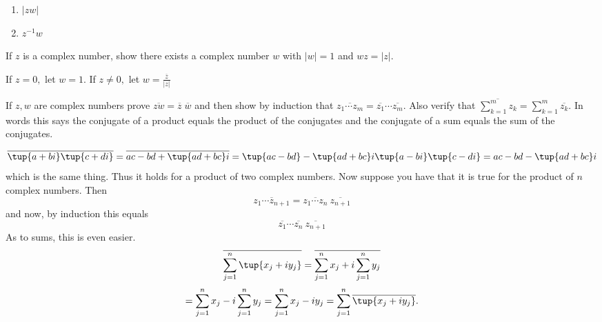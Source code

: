 \begin{enumialphparenastyle}
\begin{ex}
\begin{enumerate}
\item $\left| zw \right|$

\item $z^{-1}w$

\end{enumerate}
\end{ex}

\begin{ex} If $z$ is a complex number, show there exists a complex
number $w$ with $\left\vert w \right\vert =1$ and $wz=\left\vert
z\right\vert .$ 
\begin{sol}
If $z=0,$ let $w =1.$ If $z\neq 0,$ let $w =\displaystyle\frac{\overline{z}}{\left\vert z\right\vert }$
\end{sol}
\end{ex}

\begin{ex} \label{exercomplex2}If $z,w$ are complex
 numbers prove $
\overline{zw}=\overline{z} \; \overline{w}$ and then show by induction that 
$\overline{z_{1}\cdots z_{m}}=\overline{z_{1}}\cdots \overline{z_{m}}$. Also
verify that $\overline{\sum_{k=1}^{m}z_{k}}=\sum_{k=1}^{m}\overline{z_{k}}$.
In words this says the conjugate of a product equals the product of the
conjugates and the conjugate of a sum equals the sum of the conjugates. 
\begin{sol}
\[
\overline{\tup{a+bi} \tup{c+di} }=\overline{ac-bd+\tup{
ad+bc}i }=\tup{ac-bd} -\tup{ad+bc}i \tup{
a-bi} \tup{c-di} =ac-bd-\tup{ad+bc}i 
\]
 which is the
same thing. Thus it holds for a product of two complex numbers. Now suppose
 you have that it is true for the product of $n$ complex numbers. Then
\[
\overline{z_{1}\cdots z_{n+1}}=\overline{z_{1}\cdots z_{n}}\ \overline{
z_{n+1}}
\]
and now, by induction this equals
\[
\overline{z_{1}}\cdots \overline{z_{n}}\ \overline{z_{n+1}}
\]
As to sums, this is even easier.
\[
\overline{\sum_{j=1}^{n}\tup{x_{j}+iy_{j}} }=\overline{%
\sum_{j=1}^{n}x_{j}+i\sum_{j=1}^{n}y_{j}}
\]
\[
=\sum_{j=1}^{n}x_{j}-i\sum_{j=1}^{n}y_{j}=\sum_{j=1}^{n}x_{j}-iy_{j}=
\sum_{j=1}^{n}\overline{\tup{x_{j}+iy_{j}} }.
\]
\end{sol}
\end{ex}


\end{enumialphparenastyle}
